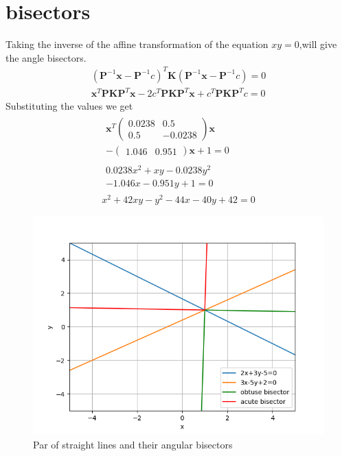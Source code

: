 \documentclass[journal,12pt,twocolumn]{IEEEtran}
\providecommand{\brak}[1]{\ensuremath{\left(#1\right)}}
\newcommand{\myvec}[1]{\ensuremath{\begin{pmatrix}#1\end{pmatrix}}}
\numberwithin{equation}{subsection}
\let\vec\mathbf
\begin{document}
\section{bisectors}
Taking the inverse of the affine transformation of the equation $xy=0$,will give the angle bisectors.
\begin{align}
    \brak{\vec{P}^{-1}\vec{x}-\vec{P}^{-1}c}^T\vec{K}\brak{\vec{P}^{-1}\vec{x}-\vec{P}^{-1}c}=0\\
    \vec{x}^T\vec{P}\vec{K}\vec{P}^T\vec{x}-2c^T\vec{P}\vec{K}\vec{P}^T\vec{x}+c^T\vec{P}\vec{K}\vec{P}^Tc=0
\end{align}
Substituting the values we get
\begin{align}
    \begin{multlined}
        \vec{x}^T\myvec{0.0238&0.5\\0.5&-0.0238}\vec{x}\\
        -\myvec{1.046&0.951}\vec{x}+1=0
    \end{multlined}\\
    \begin{multlined}
        0.0238x^2+xy-0.0238y^2\\
        -1.046x-0.951y+1=0
    \end{multlined}\\
    x^2+42xy-y^2-44x-40y+42=0
\end{align}
\begin{figure}[t]
    \centering
    \includegraphics[width=\columnwidth]{Fig2_a5.png}
    \caption{Par of straight lines and their angular bisectors}
    \label{fig:my_label}
\end{figure}
\end{document}
